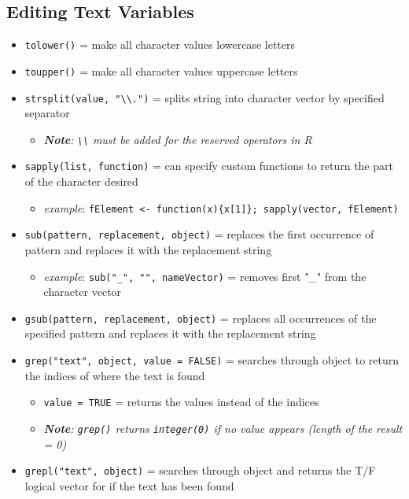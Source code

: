 \documentclass[
]{article}
\providecommand{\tightlist}{%
  \setlength{\itemsep}{0pt}\setlength{\parskip}{0pt}}
\begin{document}
\hypertarget{editing-text-variables}{%
\subsection{Editing Text Variables}\label{editing-text-variables}}

\begin{itemize}
\tightlist
\item
  \texttt{tolower()} = make all character values lowercase letters
\item
  \texttt{toupper()} = make all character values uppercase letters
\item
  \texttt{strsplit(value,\ "\textbackslash{}\textbackslash{}.")} =
  splits string into character vector by specified separator

  \begin{itemize}
  \tightlist
  \item
    \emph{\textbf{Note}: \texttt{\textbackslash{}\textbackslash{}} must
    be added for the reserved operators in R }
  \end{itemize}
\item
  \texttt{sapply(list,\ function)} = can specify custom functions to
  return the part of the character desired

  \begin{itemize}
  \tightlist
  \item
    \emph{example}:
    \texttt{fElement\ \textless{}-\ function(x)\{x{[}1{]}\};\ sapply(vector,\ fElement)}
  \end{itemize}
\item
  \texttt{sub(pattern,\ replacement,\ object)} = replaces the first
  occurrence of pattern and replaces it with the replacement string

  \begin{itemize}
  \tightlist
  \item
    \emph{example}: \texttt{sub("\_",\ "",\ nameVector)} = removes first
    "\_" from the character vector
  \end{itemize}
\item
  \texttt{gsub(pattern,\ replacement,\ object)} = replaces all
  occurrences of the specified pattern and replaces it with the
  replacement string
\item
  \texttt{grep("text",\ object,\ value\ =\ FALSE)} = searches through
  object to return the indices of where the text is found

  \begin{itemize}
  \tightlist
  \item
    \texttt{value\ =\ TRUE} = returns the values instead of the indices
  \item
    \emph{\textbf{Note}: \texttt{grep()} returns \texttt{integer(0)} if
    no value appears (length of the result = 0) }
  \end{itemize}
\item
  \texttt{grepl("text",\ object)} = searches through object and returns
  the T/F logical vector for if the text has been found


\end{itemize}
\end{document}
